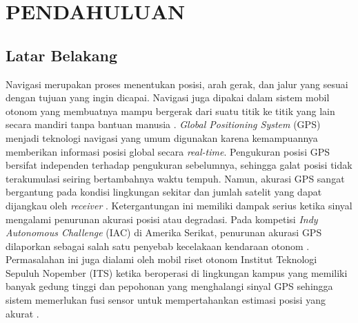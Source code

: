 \chapter{PENDAHULUAN}
\label{chap:pendahuluan}

\section{Latar Belakang}
\label{sec:latarbelakang}

Navigasi merupakan proses menentukan posisi, arah gerak, dan jalur yang sesuai dengan tujuan yang ingin dicapai.
Navigasi juga dipakai dalam sistem mobil otonom yang membuatnya mampu bergerak dari suatu titik ke titik yang lain secara mandiri tanpa bantuan manusia \parencite{Ondrus2020AutonomousCarsWork}.
\emph{Global Positioning System} (GPS) menjadi teknologi navigasi yang umum digunakan karena kemampuannya memberikan informasi posisi global secara \emph{real-time}.
Pengukuran posisi GPS bersifat independen terhadap pengukuran sebelumnya, sehingga galat posisi tidak terakumulasi seiring bertambahnya waktu tempuh.
Namun, akurasi GPS sangat bergantung pada kondisi lingkungan sekitar dan jumlah satelit yang dapat dijangkau oleh \emph{receiver} \parencite{Rahiman2013GPSNavigation}.
Ketergantungan ini memiliki dampak serius ketika sinyal mengalami penurunan akurasi posisi atau degradasi.
Pada kompetisi \emph{Indy Autonomous Challenge} (IAC) di Amerika Serikat, penurunan akurasi GPS dilaporkan sebagai salah satu penyebab kecelakaan kendaraan otonom \parencite{Lee2022ResilientNavigation}.
Permasalahan ini juga dialami oleh mobil riset otonom Institut Teknologi Sepuluh Nopember (ITS) ketika beroperasi di lingkungan kampus yang memiliki banyak gedung tinggi dan pepohonan yang menghalangi sinyal GPS sehingga sistem memerlukan fusi sensor untuk mempertahankan estimasi posisi yang akurat \parencite{Zazuli2024SensorFusion}.

